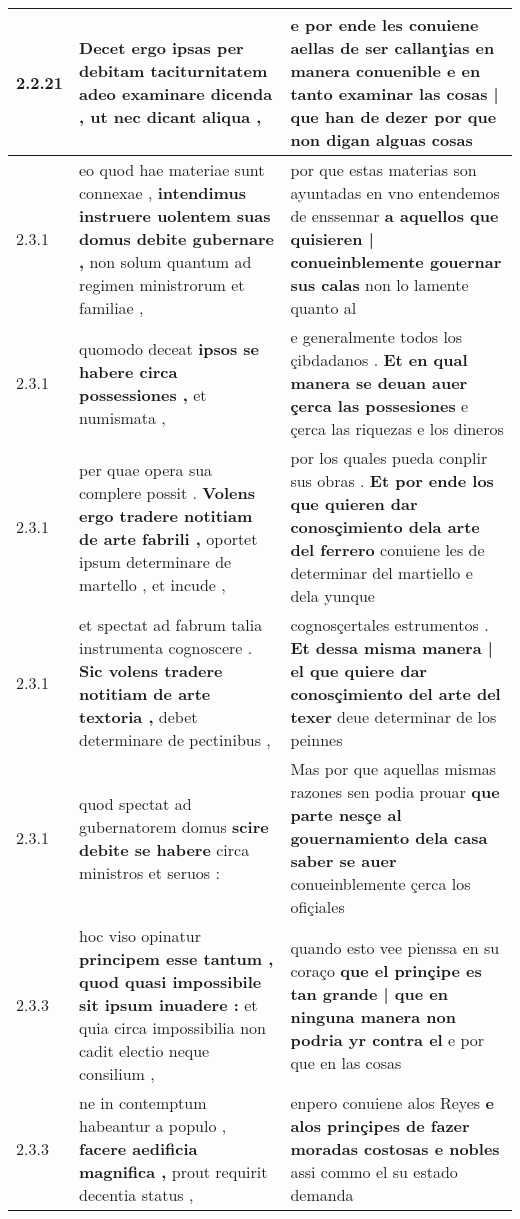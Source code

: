 \begin{tabular}{|p{1cm}|p{6.5cm}|p{6.5cm}|}
2.2.21 & Decet ergo ipsas \textbf{ per debitam taciturnitatem adeo examinare dicenda , } ut nec dicant aliqua , & e por ende les conuiene aellas de ser callanţias en manera conuenible \textbf{ e en tanto examinar las cosas | que han de dezer } por que non digan alguas cosas \\\hline
2.3.1 & eo quod hae materiae sunt connexae , \textbf{ intendimus instruere uolentem suas domus debite gubernare , } non solum quantum ad regimen ministrorum et familiae , & por que estas materias son ayuntadas en vno entendemos de enssennar \textbf{ a aquellos que quisieren | conueinblemente gouernar sus calas } non lo lamente quanto al \\\hline
2.3.1 & quomodo deceat \textbf{ ipsos se habere circa possessiones , } et numismata , & e generalmente todos los çibdadanos . \textbf{ Et en qual manera se deuan auer çerca las possesiones } e çerca las riquezas e los dineros \\\hline
2.3.1 & per quae opera sua complere possit . \textbf{ Volens ergo tradere notitiam de arte fabrili , } oportet ipsum determinare de martello , et incude , & por los quales pueda conplir sus obras . \textbf{ Et por ende los que quieren dar conosçimiento dela arte del ferrero } conuiene les de determinar del martiello e dela yunque \\\hline
2.3.1 & et spectat ad fabrum talia instrumenta cognoscere . \textbf{ Sic volens tradere notitiam de arte textoria , } debet determinare de pectinibus , & cognosçertales estrumentos . \textbf{ Et dessa misma manera | el que quiere dar conosçimiento del arte del texer } deue determinar de los peinnes \\\hline
2.3.1 & quod spectat ad gubernatorem domus \textbf{ scire debite se habere } circa ministros et seruos : & Mas por que aquellas mismas razones sen podia prouar \textbf{ que parte nesçe al gouernamiento dela casa saber se auer } conueinblemente çerca los ofiçiales \\\hline
2.3.3 & hoc viso opinatur \textbf{ principem esse tantum , quod quasi impossibile sit ipsum inuadere : } et quia circa impossibilia non cadit electio neque consilium , & quando esto vee pienssa en su coraço \textbf{ que el prinçipe es tan grande | que en ninguna manera non podria yr contra el } e por que en las cosas \\\hline
2.3.3 & ne in contemptum habeantur a populo , \textbf{ facere aedificia magnifica , } prout requirit decentia status , & enpero conuiene alos Reyes \textbf{ e alos prinçipes de fazer moradas costosas e nobles } assi commo el su estado demanda \\\hline

\end{tabular}
